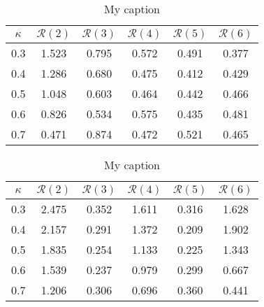 \documentclass[Dissertation.tex]{subfiles}
\begin{document}


\begin{table}[h]
\centering
\begin{tabular}{cccccc}
\toprule
$\kappa$ & $\mathcal{R}(2)$ & $\mathcal{R}(3)$ & $\mathcal{R}(4)$ & $\mathcal{R}(5)$ & $\mathcal{R}(6)$ \\
\midrule
0.3 & 1.523 & 0.795 & 0.572 & 0.491 & 0.377 \\
0.4 & 1.286 & 0.680 & 0.475 & 0.412 & 0.429 \\
0.5 & 1.048 & 0.603 & 0.464 & 0.442 & 0.466 \\
0.6 & 0.826 & 0.534 & 0.575 & 0.435 & 0.481 \\
0.7 & 0.471 & 0.874 & 0.472 & 0.521 & 0.465 \\
\bottomrule
\end{tabular}
\caption{My caption}
\label{my-label}
\end{table}


\begin{table}[h]
\centering
\begin{tabular}{cccccc}
\toprule
$\kappa$ & $\mathcal{R}(2)$ & $\mathcal{R}(3)$ & $\mathcal{R}(4)$ & $\mathcal{R}(5)$ & $\mathcal{R}(6)$ \\
\midrule
0.3 & 2.475 & 0.352 & 1.611 & 0.316 & 1.628 \\
0.4 & 2.157 & 0.291 & 1.372 & 0.209 & 1.902 \\
0.5 & 1.835 & 0.254 & 1.133 & 0.225 & 1.343 \\
0.6 & 1.539 & 0.237 & 0.979 & 0.299 & 0.667 \\
0.7 & 1.206 & 0.306 & 0.696 & 0.360 & 0.441 \\
\bottomrule
\end{tabular}
\caption{My caption}
\label{my-label}
\end{table}
\end{document}
